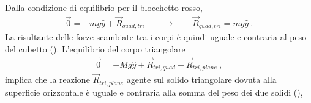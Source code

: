 \documentclass[letterpaper,10pt,italian]{jupyterBook}
\begin{document}
\sphinxAtStartPar
Dalla condizione di equilibrio per il blocchetto rosso,
\begin{equation*}
\begin{split}\vec{0} = - m g \hat{y} + \vec{R}_{quad, tri} \qquad \rightarrow \qquad \vec{R}_{quad, tri} = m g \hat{y} \ .\end{split}
\end{equation*}
\sphinxAtStartPar
La risultante delle forze scambiate tra i corpi è quindi uguale e contraria al peso del cubetto (). L’equilibrio del corpo triangolare
\begin{equation*}
\begin{split}
  \vec{0} = - M g \hat{y} + \vec{R}_{tri, quad} + \vec{R}_{tri, plane} \ ,
\end{split}
\end{equation*}
\sphinxAtStartPar
implica che la reazione \(\vec{R}_{tri,plane}\) agente sul solido triangolare dovuta alla superficie orizzontale è uguale e contraria alla somma del peso dei due solidi (),
\end{document}
